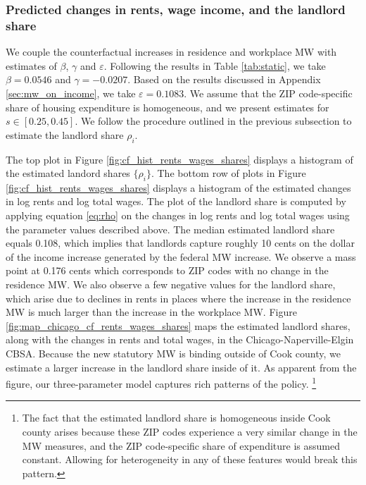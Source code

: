 \subsubsection*{Predicted changes in rents, wage income, and the landlord share}
\label{sec:cf_rents_and_wage_changes}

We couple the counterfactual increases in residence and workplace MW with 
estimates of $\beta$, $\gamma$ and $\varepsilon$.
Following the results in Table \ref{tab:static}, we take $\beta = 0.0546$ and 
$\gamma=-0.0207$.
Based on the results discussed in Appendix \ref{sec:mw_on_income}, we take
$\varepsilon = 0.1083$.
We assume that the ZIP code-specific share of housing expenditure is homogeneous,
and we present estimates for $s\in\left[0.25,0.45\right]$.
We follow the procedure outlined in the previous subsection to estimate the 
landlord share $\rho_i$.

The top plot in Figure \ref{fig:cf_hist_rents_wages_shares} displays a histogram 
of the estimated landord shares $\{\rho_i\}$.
The bottom row of plots in Figure \ref{fig:cf_hist_rents_wages_shares} displays 
a histogram of the estimated changes in log rents and log total wages.
The plot of the landlord share is computed by applying equation \eqref{eq:rho} 
on the changes in log rents and log total wages using the parameter values
described above.
The median estimated landlord share equals 0.108, which implies that landlords
capture roughly 10 cents on the dollar of the income increase generated by the 
federal MW increase.
We observe a mass point at 0.176 cents which corresponds to ZIP codes with
no change in the residence MW.
We also observe a few negative values for the landlord share, which
arise due to declines in rents in places where the increase in the residence MW
is much larger than the increase in the workplace MW.
Figure \ref{fig:map_chicago_cf_rents_wages_shares} maps the estimated 
landlord shares, along with the changes in rents and total wages, in the 
Chicago-Naperville-Elgin CBSA.
Because the new statutory MW is binding outside of Cook county, 
we estimate a larger increase in the landlord share inside of it.
As apparent from the figure, our three-parameter model captures rich patterns
of the policy.%
\footnote{The fact that the estimated landlord share is homogeneous inside Cook 
county arises because these ZIP codes experience a very similar change in the MW 
measures, and the ZIP code-specific share of expenditure is assumed constant.
Allowing for heterogeneity in any of these features would break this pattern.}

